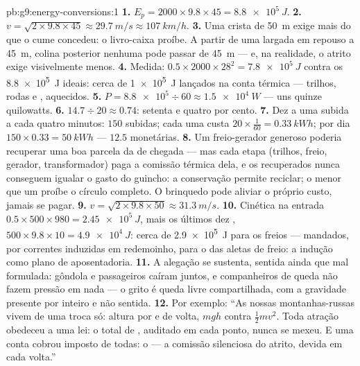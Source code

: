 \begin{solution}{pb:g9:energy-conversions:1}
\textbf{1.} $E_p = 2000 \times 9.8 \times 45 = \qty{8.8e5}{J}$.
\textbf{2.} $v = \sqrt{2 \times 9.8 \times 45} \approx
\qty{29.7}{m/s} \approx \qty{107}{km/h}$.
\textbf{3.} Uma crista de \qty{50}{m} exige mais  do que o
cume concedeu: o livro-caixa proíbe. A partir de uma largada em
repouso a \qty{45}{m}, colina posterior nenhuma pode passar de
\qty{45}{m} --- e, na realidade, o atrito exige visivelmente menos.
\textbf{4.} Medida: $0.5 \times 2000 \times 28^2 = \qty{7.8e5}{J}$
contra os \qty{8.8e5}{J} ideais: cerca de \qty{1e5}{J} lançados na
conta térmica --- trilhos, rodas e , aquecidos.
\textbf{5.} $P = \num{8.8e5} \div 60 \approx \qty{1.5e4}{W}$ --- uns
quinze quilowatts.
\textbf{6.} $14.7 \div 20 \approx 0.74$: setenta e quatro por cento.
\textbf{7.} Dez  a uma subida a cada quatro minutos: $150$
subidas; cada uma custa
$20 \times \tfrac{1}{60} = \qty{0.33}{kWh}$; por dia
$150 \times 0.33 = \qty{50}{kWh}$ --- $12.5$  monetárias.
\textbf{8.} Um freio-gerador generoso poderia recuperar uma boa
parcela da  de chegada --- mas cada etapa (trilhos,
freio, gerador, transformador) paga a comissão térmica dela, e os
 recuperados nunca conseguem igualar o gasto do guincho: a
conservação permite reciclar; o  menor que um proíbe o
círculo completo. O brinquedo pode aliviar o próprio custo, jamais se
pagar.
\textbf{9.} $v = \sqrt{2 \times 9.8 \times 50} \approx
\qty{31.3}{m/s}$.
\textbf{10.} Cinética na entrada
$0.5 \times 500 \times 980 = \qty{2.45e5}{J}$, mais os últimos dez
, $500 \times 9.8 \times 10 = \qty{4.9e4}{J}$: cerca de
\qty{2.9e5}{J} para os freios --- mandados, por correntes induzidas
em redemoinho, para o  das aletas de freio: a indução como plano
de aposentadoria.
\textbf{11.} A alegação se sustenta, sentida ainda que mal formulada:
gôndola e passageiros caíram juntos, e companheiros de queda não
fazem pressão em nada --- o grito é queda livre compartilhada, com a
gravidade presente por inteiro e não sentida.
\textbf{12.} Por exemplo: ``As nossas montanhas-russas vivem de uma
troca só: altura por  e de volta, $m g h$ contra
$\frac12 m v^2$. Toda atração obedeceu a uma lei: o total de ,
auditado em cada ponto, nunca se mexeu. E uma conta cobrou imposto de
todas: o  --- a comissão silenciosa do atrito, devida em cada
volta.''
\end{solution}
